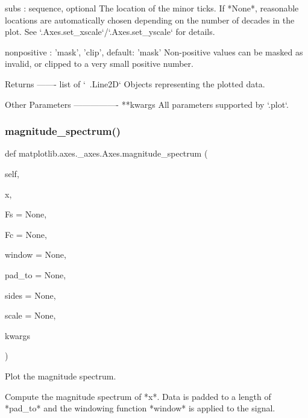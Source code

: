 \begin{DoxyVerb}
\begin{DoxyVerb}
subs : sequence, optional
    The location of the minor ticks. If *None*, reasonable locations
    are automatically chosen depending on the number of decades in the
    plot. See `.Axes.set_xscale`/`.Axes.set_yscale` for details.

nonpositive : {'mask', 'clip'}, default: 'mask'
    Non-positive values can be masked as invalid, or clipped to a very
    small positive number.

Returns
-------
list of `~.Line2D`
    Objects representing the plotted data.

Other Parameters
----------------
**kwargs
    All parameters supported by `.plot`.
\end{DoxyVerb}
 \mbox{\label{classmatplotlib_1_1axes_1_1__axes_1_1Axes_ab09d5d69b6e9b6d5525bfff1432e27c2}} 
\subsubsection{\texorpdfstring{magnitude\+\_\+spectrum()}{magnitude\_spectrum()}}
{\footnotesize\ttfamily def matplotlib.\+axes.\+\_\+axes.\+Axes.\+magnitude\+\_\+spectrum (\begin{DoxyParamCaption}\item[{}]{self,  }\item[{}]{x,  }\item[{}]{Fs = {\ttfamily None},  }\item[{}]{Fc = {\ttfamily None},  }\item[{}]{window = {\ttfamily None},  }\item[{}]{pad\+\_\+to = {\ttfamily None},  }\item[{}]{sides = {\ttfamily None},  }\item[{}]{scale = {\ttfamily None},  }\item[{}]{kwargs }\end{DoxyParamCaption})}

\begin{DoxyVerb}Plot the magnitude spectrum.

Compute the magnitude spectrum of *x*.  Data is padded to a
length of *pad_to* and the windowing function *window* is applied to
the signal.


\end{DoxyVerb}
\end{DoxyVerb}
